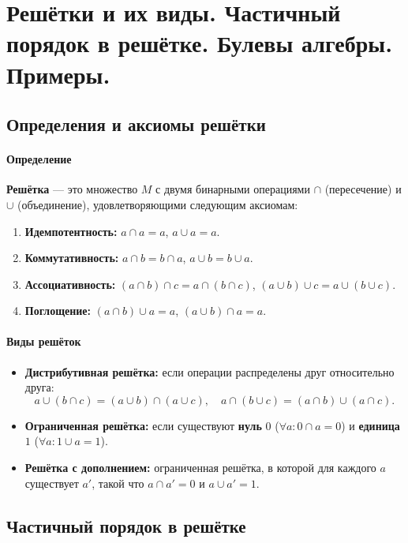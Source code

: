 \section{Решётки и их виды. Частичный порядок в решётке. Булевы алгебры. Примеры.}

\subsection*{Определения и аксиомы решётки}

\paragraph{Определение}
\textbf{Решётка} — это множество $M$ с двумя бинарными операциями $\cap$ (пересечение) и $\cup$ (объединение), удовлетворяющими следующим аксиомам:
\begin{enumerate}
    \item \textbf{Идемпотентность:} $a \cap a = a$, $a \cup a = a$.
    \item \textbf{Коммутативность:} $a \cap b = b \cap a$, $a \cup b = b \cup a$.
    \item \textbf{Ассоциативность:} $(a \cap b) \cap c = a \cap (b \cap c)$, $(a \cup b) \cup c = a \cup (b \cup c)$.
    \item \textbf{Поглощение:} $(a \cap b) \cup a = a$, $(a \cup b) \cap a = a$.
\end{enumerate}

\paragraph{Виды решёток}
\begin{itemize}
    \item \textbf{Дистрибутивная решётка:} если операции распределены друг относительно друга:
    $$a \cup (b \cap c) = (a \cup b) \cap (a \cup c), \quad a \cap (b \cup c) = (a \cap b) \cup (a \cap c).$$
    \item \textbf{Ограниченная решётка:} если существуют \textbf{нуль} $0$ ($\forall a: 0 \cap a = 0$) и \textbf{единица} $1$ ($\forall a: 1 \cup a = 1$).
    \item \textbf{Решётка с дополнением:} ограниченная решётка, в которой для каждого $a$ существует $a'$, такой что $a \cap a' = 0$ и $a \cup a' = 1$.
\end{itemize}

\subsection*{Частичный порядок в решётке}

